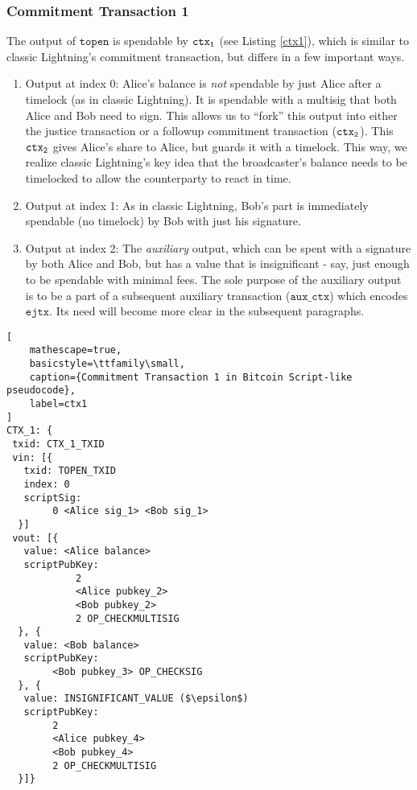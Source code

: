 \subsubsection{Commitment Transaction 1}
The output of $\texttt{topen}$ is spendable by $\texttt{ctx\textsubscript{1}}$ (see Listing \ref{ctx1}), which is similar to classic Lightning's commitment transaction, but differs in a few important ways.
\begin{enumerate}
    \item Output at index 0: Alice's balance is \textit{not} spendable by just Alice after a timelock (as in classic Lightning). It is spendable with a multisig that both Alice and Bob need to sign. This allows us to ``fork'' this output into either the justice transaction or a followup commitment transaction ($\texttt{ctx\textsubscript{2}}$). This $\texttt{ctx\textsubscript{2}}$ gives Alice's share to Alice, but guards it with a timelock. This way, we realize classic Lightning's key idea that the broadcaster's balance needs to be timelocked to allow the counterparty to react in time.
    \item Output at index 1: As in classic Lightning, Bob's part is immediately spendable (no timelock) by Bob with just his signature.
    \item Output at index 2: The \textit{auxiliary} output, which can be spent with a signature by both Alice and Bob, but has a value that is insignificant - say, just enough to be spendable with minimal fees. The sole purpose of the auxiliary output is to be a part of a subsequent auxiliary transaction ($\texttt{aux\_ctx}$) which encodes $\texttt{ejtx}$. Its need will become more clear in the subsequent paragraphs.
\end{enumerate}

\begin{lstlisting}[
    mathescape=true,
    basicstyle=\ttfamily\small,
    caption={Commitment Transaction 1 in Bitcoin Script-like pseudocode},
    label=ctx1
]
CTX_1: {
 txid: CTX_1_TXID
 vin: [{
   txid: TOPEN_TXID
   index: 0
   scriptSig: 
        0 <Alice sig_1> <Bob sig_1>
  }]
 vout: [{
   value: <Alice balance>
   scriptPubKey:
            2 
            <Alice pubkey_2> 
            <Bob pubkey_2> 
            2 OP_CHECKMULTISIG
  }, {
   value: <Bob balance>
   scriptPubKey: 
        <Bob pubkey_3> OP_CHECKSIG
  }, {
   value: INSIGNIFICANT_VALUE ($\epsilon$)
   scriptPubKey: 
        2 
        <Alice pubkey_4> 
        <Bob pubkey_4> 
        2 OP_CHECKMULTISIG
  }]}
\end{lstlisting}

